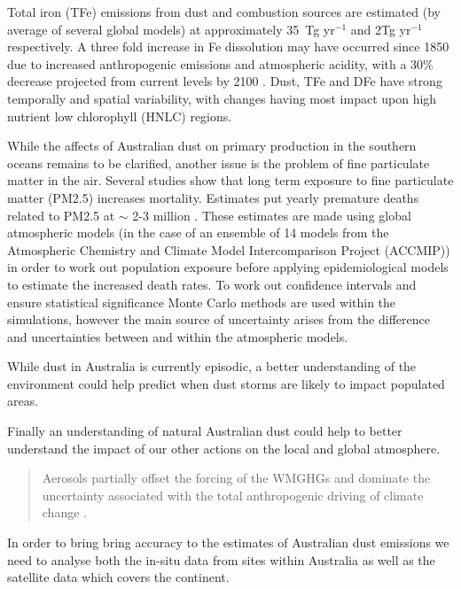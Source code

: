 Total iron (TFe) emissions from dust and combustion sources are estimated (by average of several global models) at approximately 35~Tg yr$^{-1}$ and 2Tg yr$^{-1}$ respectively. A three fold increase in Fe dissolution may have occurred since 1850 due to increased anthropogenic emissions and atmospheric acidity, with a 30\% decrease projected from current levels by 2100 \cite{Myriokefalitakis_2015}.
Dust, TFe and DFe have strong temporally and spatial variability, with changes having most impact upon high nutrient low chlorophyll (HNLC) regions.

While the affects of Australian dust on primary production in the southern oceans remains to be clarified, another issue is the problem of fine particulate matter in the air.
Several studies show that long term exposure to fine particulate matter (PM2.5) increases mortality. 
Estimates put yearly premature deaths related to PM2.5 at $\sim$ 2-3 million \cite{Hoek_2013, 19627030, Silva_2013, Lelieveld_2015}.   
These estimates are made using global atmospheric models (in the case of \citet{Silva_2013} an ensemble of 14 models from the Atmospheric Chemistry and Climate Model Intercomparison Project (ACCMIP)) in order to work out population exposure before applying epidemiological models to estimate the increased death rates.
To work out confidence intervals and ensure statistical significance Monte Carlo methods are used within the simulations, however the main source of uncertainty arises from the difference and uncertainties between and within the atmospheric models.

While dust in Australia is currently episodic, a better understanding of the environment could help predict when dust storms are likely to impact populated areas.

Finally an understanding of natural Australian dust could help to better understand the impact of our other actions on the local and global atmosphere. 
\begin{quote}
Aerosols partially offset the forcing of the WMGHGs and dominate the uncertainty associated with the total anthropogenic driving of climate change \cite{IPCC_2013_chap8}.
\end{quote}
In order to bring bring accuracy to the estimates of Australian dust emissions we need to analyse both the in-situ data from sites within Australia as well as the satellite data which covers the continent.